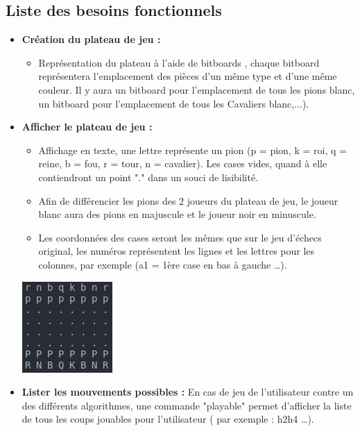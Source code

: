 \documentclass{article}
\begin{document}
\subsection{Liste des besoins fonctionnels}
\medskip

\begin{itemize}

    \item \textbf{Création du plateau de jeu : }
    \medskip
    \begin{itemize}
        \item Représentation du plateau à l'aide de bitboards \cite{Bitboards}, chaque bitboard représentera l'emplacement des pièces d'un même type et d'une même couleur. Il y aura un bitboard pour l'emplacement de tous les pions blanc, un bitboard pour l'emplacement de tous les Cavaliers blanc,...).
    \end{itemize}
    \medskip
    \item \textbf{Afficher le plateau de jeu : }
    \medskip
    \begin{itemize}
        \item Affichage en texte, une lettre représente un pion (p = pion, k = roi, q = reine,
        b = fou, r = tour, n = cavalier).
        Les cases vides, quand à elle contiendront un point "." dans un souci de lisibilité.
        \item Afin de différencier les pions des 2 joueurs du plateau de jeu, le joueur blanc aura des pions en majuscule et le joueur noir en minuscule.
        \item Les coordonnées des cases seront les mêmes que sur le jeu d'échecs original, les numéros représentent les lignes et les lettres pour les colonnes, par exemple (a1 = 1ère case en bas à gauche \dots).
    \end{itemize}
    \centerline{\includegraphics[scale = 0.5]{img/echecs_title.png}}
    \medskip
    \item \textbf{Lister les mouvements possibles : }
    \newline
    En cas de jeu de l'utilisateur contre un des différents algorithmes, une commande "playable" permet d'afficher la liste de tous les coups jouables pour l'utilisateur ( par exemple : h2h4 \dots).

\end{itemize}
\end{document}
